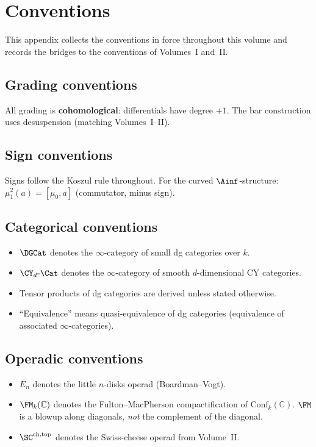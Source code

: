 \chapter{Conventions}
\label{app:conventions}

This appendix collects the conventions in force throughout this volume and
records the bridges to the conventions of Volumes~I and~II.

\section{Grading conventions}
\label{sec:grading-conventions}

All grading is \textbf{cohomological}: differentials have degree $+1$. The
bar construction uses desuspension (matching Volumes~I--II).

\section{Sign conventions}
\label{sec:sign-conventions}

Signs follow the Koszul rule throughout. For the curved $\Ainf$-structure:
$\mu_1^2(a) = [\mu_0, a]$ (commutator, minus sign).

\section{Categorical conventions}
\label{sec:categorical-conventions}

\begin{itemize}
 \item $\DGCat$ denotes the $\infty$-category of small dg categories over $k$.
 \item $\CY_d\text{-}\Cat$ denotes the $\infty$-category of smooth
 $d$-dimensional CY categories.
 \item Tensor products of dg categories are derived unless stated otherwise.
 \item ``Equivalence'' means quasi-equivalence of dg categories
 (equivalence of associated $\infty$-categories).
\end{itemize}

\section{Operadic conventions}
\label{sec:operadic-conventions}

\begin{itemize}
 \item $E_n$ denotes the little $n$-disks operad (Boardman--Vogt).
 \item $\FM_k(\mathbb{C})$ denotes the Fulton--MacPherson compactification of
 $\mathrm{Conf}_k(\mathbb{C})$. $\FM$ is a blowup along diagonals,
 \emph{not} the complement of the diagonal.
 \item $\SC^{\mathrm{ch,top}}$ denotes the Swiss-cheese operad from
 Volume~II.
\end{itemize}

